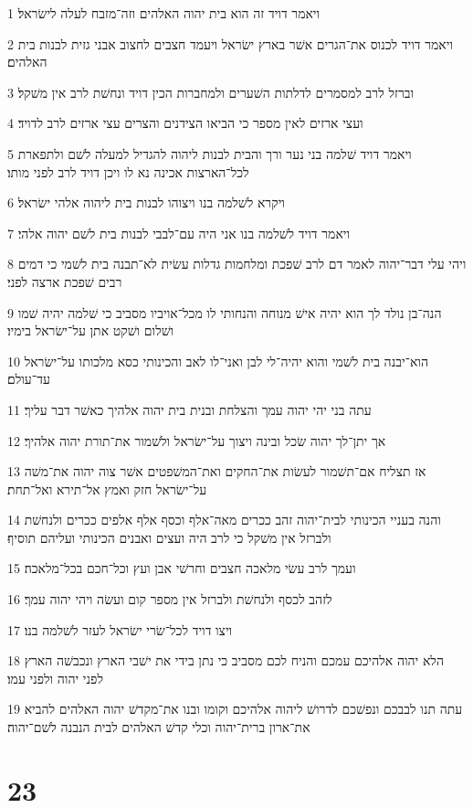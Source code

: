 \par 1 ויאמר דויד זה הוא בית יהוה האלהים וזה־מזבח לעלה לישׂראל׃
\par 2 ויאמר דויד לכנוס את־הגרים אשׁר בארץ ישׂראל ויעמד חצבים לחצוב אבני גזית לבנות בית האלהים׃
\par 3 וברזל לרב למסמרים לדלתות השׁערים ולמחברות הכין דויד ונחשׁת לרב אין משׁקל׃
\par 4 ועצי ארזים לאין מספר כי הביאו הצידנים והצרים עצי ארזים לרב לדויד׃
\par 5 ויאמר דויד שׁלמה בני נער ורך והבית לבנות ליהוה להגדיל למעלה לשׁם ולתפארת לכל־הארצות אכינה נא לו ויכן דויד לרב לפני מותו׃
\par 6 ויקרא לשׁלמה בנו ויצוהו לבנות בית ליהוה אלהי ישׂראל׃
\par 7 ויאמר דויד לשׁלמה בנו אני היה עם־לבבי לבנות בית לשׁם יהוה אלהי׃
\par 8 ויהי עלי דבר־יהוה לאמר דם לרב שׁפכת ומלחמות גדלות עשׂית לא־תבנה בית לשׁמי כי דמים רבים שׁפכת ארצה לפני׃
\par 9 הנה־בן נולד לך הוא יהיה אישׁ מנוחה והנחותי לו מכל־אויביו מסביב כי שׁלמה יהיה שׁמו ושׁלום ושׁקט אתן על־ישׂראל בימיו׃
\par 10 הוא־יבנה בית לשׁמי והוא יהיה־לי לבן ואני־לו לאב והכינותי כסא מלכותו על־ישׂראל עד־עולם׃
\par 11 עתה בני יהי יהוה עמך והצלחת ובנית בית יהוה אלהיך כאשׁר דבר עליך׃
\par 12 אך יתן־לך יהוה שׂכל ובינה ויצוך על־ישׂראל ולשׁמור את־תורת יהוה אלהיך׃
\par 13 אז תצליח אם־תשׁמור לעשׂות את־החקים ואת־המשׁפטים אשׁר צוה יהוה את־משׁה על־ישׂראל חזק ואמץ אל־תירא ואל־תחת׃
\par 14 והנה בעניי הכינותי לבית־יהוה זהב ככרים מאה־אלף וכסף אלף אלפים ככרים ולנחשׁת ולברזל אין משׁקל כי לרב היה ועצים ואבנים הכינותי ועליהם תוסיף׃
\par 15 ועמך לרב עשׂי מלאכה חצבים וחרשׁי אבן ועץ וכל־חכם בכל־מלאכה׃
\par 16 לזהב לכסף ולנחשׁת ולברזל אין מספר קום ועשׂה ויהי יהוה עמך׃
\par 17 ויצו דויד לכל־שׂרי ישׂראל לעזר לשׁלמה בנו׃
\par 18 הלא יהוה אלהיכם עמכם והניח לכם מסביב כי נתן בידי את ישׁבי הארץ ונכבשׁה הארץ לפני יהוה ולפני עמו׃
\par 19 עתה תנו לבבכם ונפשׁכם לדרושׁ ליהוה אלהיכם וקומו ובנו את־מקדשׁ יהוה האלהים להביא את־ארון ברית־יהוה וכלי קדשׁ האלהים לבית הנבנה לשׁם־יהוה׃

\chapter{23}

